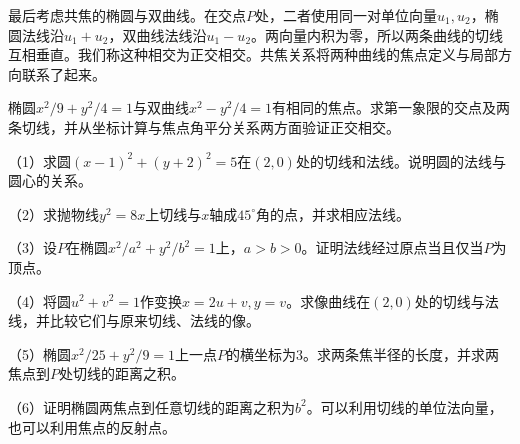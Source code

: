 最后考虑共焦的椭圆与双曲线。在交点\(P\)处，二者使用同一对单位向量\(u_1,u_2\)，椭圆法线沿\(u_1+u_2\)，双曲线法线沿\(u_1-u_2\)。两向量内积为零，所以两条曲线的切线互相垂直。我们称这种相交为{\heiti{}正交相交}。共焦关系将两种曲线的焦点定义与局部方向联系了起来。

\par\noindent\begin{minipage}{\linewidth}
\begin{example}
椭圆\(x^2/9+y^2/4=1\)与双曲线\(x^2-y^2/4=1\)有相同的焦点。求第一象限的交点及两条切线，并从坐标计算与焦点角平分关系两方面验证正交相交。
\end{example}
\end{minipage}\par

\begin{exercise}
\mbox{}\par\nobreak
\begin{samepage}
（1）求圆\((x-1)^2+(y+2)^2=5\)在\((2,0)\)处的切线和法线。说明圆的法线与圆心的关系。
\par
\end{samepage}

\begin{samepage}
（2）求抛物线\(y^2=8x\)上切线与\(x\)轴成\(45^\circ\)角的点，并求相应法线。
\par
\end{samepage}

\begin{samepage}
（3）设\(P\)在椭圆\(x^2/a^2+y^2/b^2=1\)上，\(a>b>0\)。证明法线经过原点当且仅当\(P\)为顶点。
\par
\end{samepage}

\begin{samepage}
（4）将圆\(u^2+v^2=1\)作变换\(x=2u+v,y=v\)。求像曲线在\((2,0)\)处的切线与法线，并比较它们与原来切线、法线的像。
\par
\end{samepage}

\begin{samepage}
（5）椭圆\(x^2/25+y^2/9=1\)上一点\(P\)的横坐标为\(3\)。求两条焦半径的长度，并求两焦点到\(P\)处切线的距离之积。
\par
\end{samepage}

\begin{samepage}
（6）证明椭圆两焦点到任意切线的距离之积为\(b^2\)。可以利用切线的单位法向量，也可以利用焦点的反射点。
\par
\end{samepage}


\end{exercise}
